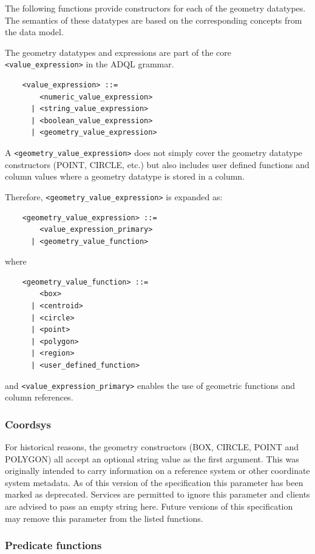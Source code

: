 \documentclass[11pt,a4paper]{ivoa}
\begin{document}
The following functions provide constructors for each of the geometry datatypes.
The semantics of these datatypes are based on the corresponding
concepts from the \STCSpec data model.

The geometry datatypes and expressions are part of the core \verb:<value_expression>:
in the ADQL grammar.

\begin{verbatim}
    <value_expression> ::=
        <numeric_value_expression>
      | <string_value_expression>
      | <boolean_value_expression>
      | <geometry_value_expression>
\end{verbatim}

A \verb:<geometry_value_expression>: does not simply cover the geometry datatype
constructors (POINT, CIRCLE, etc.) but also includes user defined functions and
column values where a geometry datatype is stored in a column.

Therefore, \verb:<geometry_value_expression>: is expanded as:
\begin{verbatim}
    <geometry_value_expression> ::= 
        <value_expression_primary>
      | <geometry_value_function>
\end{verbatim}
\noindent
where
\begin{verbatim}
    <geometry_value_function> ::=
        <box>
      | <centroid>
      | <circle>
      | <point>
      | <polygon>
      | <region>
      | <user_defined_function>
\end{verbatim}
and \verb:<value_expression_primary>: enables the use of geometric functions
and column references.

\subsubsection{Coordsys}
\label{sec:geom.coordsys.param}

For historical reasons, the geometry constructors (BOX, CIRCLE, POINT
and POLYGON) all accept an optional string value as the first argument.
This was originally intended to carry
information on a reference system or other coordinate system metadata.
As of this version of the specification this parameter has been
marked as deprecated. Services are permitted to ignore this parameter and
clients are advised to pass an empty string here. Future versions of this
specification may remove this parameter from the listed functions.

\subsubsection{Predicate functions}
\label{sec:functions.geom.predicate}
\end{document}

